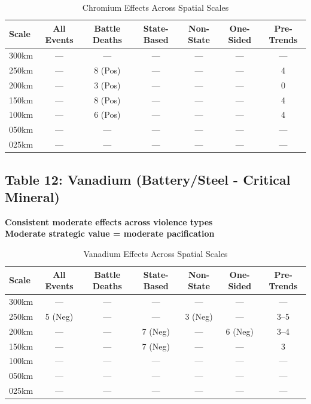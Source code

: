 \documentclass[11pt]{article}
\begin{document}
\begin{table}[H]
\centering
\caption{Chromium Effects Across Spatial Scales}
\begin{tabular}{lcccccc}
\toprule
Scale & All Events & Battle Deaths & State-Based & Non-State & One-Sided & Pre-Trends \\
\midrule
300km & ---       & ---           & ---         & ---       & ---       & ---        \\
250km & ---       & 8 (Pos)       & ---         & ---       & ---       & 4          \\
200km & ---       & 3 (Pos)       & ---         & ---       & ---       & 0          \\
150km & ---       & 8 (Pos)       & ---         & ---       & ---       & 4          \\
100km & ---       & 6 (Pos)       & ---         & ---       & ---       & 4          \\
050km & ---       & ---           & ---         & ---       & ---       & ---        \\
025km & ---       & ---           & ---         & ---       & ---       & ---        \\
\bottomrule
\end{tabular}
\end{table}


\subsection{Table 12: Vanadium (Battery/Steel - Critical Mineral)}

\textbf{Consistent moderate effects across violence types}\\
\textbf{Moderate strategic value = moderate pacification}

\begin{table}[H]
\centering
\caption{Vanadium Effects Across Spatial Scales}
\begin{tabular}{lcccccc}
\toprule
Scale & All Events & Battle Deaths & State-Based & Non-State & One-Sided & Pre-Trends \\
\midrule
300km & ---       & ---           & ---         & ---       & ---       & ---        \\
250km & 5 (Neg)   & ---           & ---         & 3 (Neg)   & ---       & 3--5       \\
200km & ---       & ---           & 7 (Neg)     & ---       & 6 (Neg)   & 3--4       \\
150km & ---       & ---           & 7 (Neg)     & ---       & ---       & 3          \\
100km & ---       & ---           & ---         & ---       & ---       & ---        \\
050km & ---       & ---           & ---         & ---       & ---       & ---        \\
025km & ---       & ---           & ---         & ---       & ---       & ---        \\
\bottomrule
\end{tabular}
\end{table}
\end{document}
